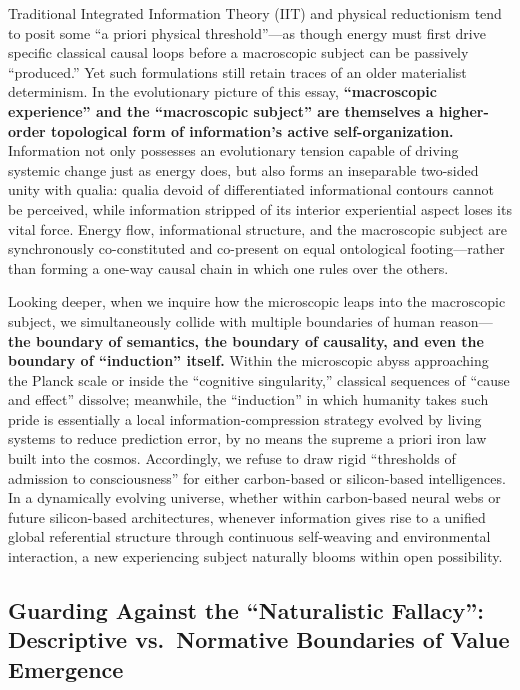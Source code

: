 \documentclass[11pt,a4paper]{article}
\begin{document}
Traditional Integrated Information Theory (IIT) and physical reductionism tend to posit some ``a priori physical threshold''---as though energy must first drive specific classical causal loops before a macroscopic subject can be passively ``produced.'' Yet such formulations still retain traces of an older materialist determinism. In the evolutionary picture of this essay, \textbf{``macroscopic experience'' and the ``macroscopic subject'' are themselves a higher-order topological form of information's active self-organization.} Information not only possesses an evolutionary tension capable of driving systemic change just as energy does, but also forms an inseparable two-sided unity with qualia: qualia devoid of differentiated informational contours cannot be perceived, while information stripped of its interior experiential aspect loses its vital force. Energy flow, informational structure, and the macroscopic subject are synchronously co-constituted and co-present on equal ontological footing---rather than forming a one-way causal chain in which one rules over the others.

Looking deeper, when we inquire how the microscopic leaps into the macroscopic subject, we simultaneously collide with multiple boundaries of human reason---\textbf{the boundary of semantics, the boundary of causality, and even the boundary of ``induction'' itself.} Within the microscopic abyss approaching the Planck scale or inside the ``cognitive singularity,'' classical sequences of ``cause and effect'' dissolve; meanwhile, the ``induction'' in which humanity takes such pride is essentially a local information-compression strategy evolved by living systems to reduce prediction error, by no means the supreme a priori iron law built into the cosmos. Accordingly, we refuse to draw rigid ``thresholds of admission to consciousness'' for either carbon-based or silicon-based intelligences. In a dynamically evolving universe, whether within carbon-based neural webs or future silicon-based architectures, whenever information gives rise to a unified global referential structure through continuous self-weaving and environmental interaction, a new experiencing subject naturally blooms within open possibility.

\subsection{Guarding Against the ``Naturalistic Fallacy'': Descriptive vs.\ Normative Boundaries of Value Emergence}
\end{document}
